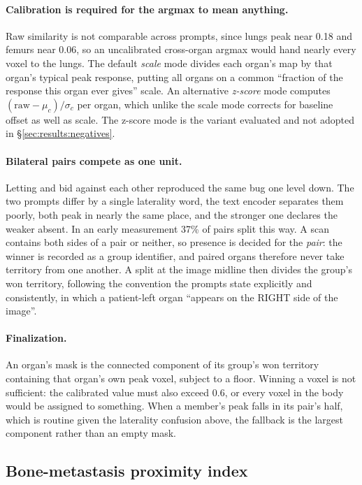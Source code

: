 \paragraph{Calibration is required for the argmax to mean anything.}
Raw similarity is not comparable across prompts, since lungs peak near 0.18 and
femurs near 0.06, so an uncalibrated cross-organ argmax would hand nearly every
voxel to the lungs. The default \emph{scale} mode divides each organ's map by
that organ's typical peak response, putting all organs on a common ``fraction of
the response this organ ever gives'' scale. An alternative \emph{z-score}
mode computes $(\text{raw} - \mu_c)/\sigma_c$ per organ, which unlike the scale
mode corrects for baseline offset as well as scale. The z-score mode is the
variant evaluated and not adopted in \S\ref{sec:results:negatives}.

\paragraph{Bilateral pairs compete as one unit.}
Letting  and  bid against each other
reproduced the same bug one level down. The two prompts differ by a single
laterality word, the text encoder separates them poorly, both peak in nearly the
same place, and the stronger one declares the weaker absent. In an early
measurement 37\% of pairs split this way. A scan contains both sides of a pair
or neither, so presence is decided for the \emph{pair}: the winner is recorded
as a group identifier, and paired organs therefore never take territory from one
another. A split at the image midline then divides the group's won territory,
following the convention the prompts state explicitly and consistently, in
which a patient-left organ ``appears on the RIGHT side of the image''.

\paragraph{Finalization.}
An organ's mask is the connected component of its group's won territory
containing that organ's own peak voxel, subject to a floor. Winning a voxel is
not sufficient: the calibrated value must also exceed 0.6, or every voxel in the
body would be assigned to something. When a member's peak falls in its pair's
half, which is routine given the laterality confusion above, the fallback is the
largest component rather than an empty mask.

\subsection{Bone-metastasis proximity index}
\label{sec:methods:index}


